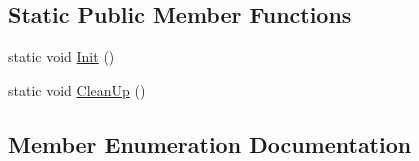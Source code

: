 \subsection*{Static Public Member Functions}
\begin{DoxyCompactItemize}
\item 
static void \hyperlink{class_n_m_1_1_o_d_b_1_1_c_type_a7e6ee72014cdb6fba32c122a61a705f9}{Init} ()
\item 
static void \hyperlink{class_n_m_1_1_o_d_b_1_1_c_type_ab4fe7b8313fd139e65e4ed83d67f606f}{Clean\+Up} ()
\end{DoxyCompactItemize}


\subsection{Member Enumeration Documentation}
\hypertarget{class_n_m_1_1_o_d_b_1_1_c_type_ad03443dbcd5bbf2ab1dfe9380d11a467}{}
